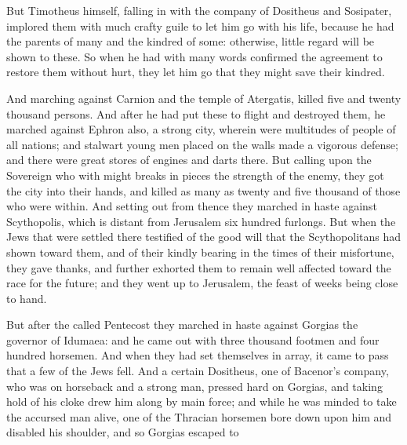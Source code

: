 {But Timotheus himself, falling in with the company of Dositheus and Sosipater, implored them with much crafty guile to let him go with his life, because he had
{} the parents of many
{} and the kindred of some:
 otherwise,
{} little regard will
 be shown to these.
So when he had with many words confirmed the agreement to restore them without hurt, they let him go that they might save their kindred.
\par }{\PP {}And
{} marching against
 Carnion and the temple of Atergatis, killed five and twenty thousand persons.
And after he had put these to flight and destroyed them, he marched against Ephron also, a strong city,
 wherein were multitudes of people of all nations; and stalwart young men placed
 on the walls made a vigorous defense; and there were great stores of engines and darts there.
But calling upon the Sovereign who with might breaks in pieces the
 strength of
 the enemy, they got the city into their hands, and killed as many as twenty and five thousand of those who were within.
And setting out from thence they marched in haste against Scythopolis, which is distant from Jerusalem six hundred furlongs.
But when the Jews that were settled there testified of the good will that the Scythopolitans had shown toward them, and of their kindly bearing
{} in the times of their misfortune,
they gave thanks, and further exhorted them to remain well affected toward the race for the future; and they went up to Jerusalem, the feast of weeks being close to hand.
\par }{\PP {}But after the
{} called Pentecost they marched in haste against Gorgias the governor of Idumaea:
and he came out with three thousand footmen and four hundred horsemen.
And when they had set themselves in array, it came to pass that a few of the Jews fell.
And a certain Dositheus, one
 of Bacenor’s company, who was on horseback and a strong man, pressed hard on Gorgias, and taking hold of his cloke drew him along by main force; and while he was minded to take the accursed man alive, one of the Thracian horsemen bore down upon him and disabled his shoulder, and so Gorgias escaped to
}
